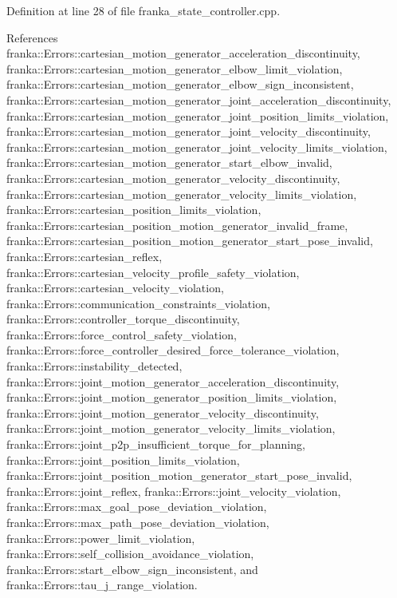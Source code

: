 Definition at line 28 of file franka\+\_\+state\+\_\+controller.\+cpp.



References franka\+::\+Errors\+::cartesian\+\_\+motion\+\_\+generator\+\_\+acceleration\+\_\+discontinuity, franka\+::\+Errors\+::cartesian\+\_\+motion\+\_\+generator\+\_\+elbow\+\_\+limit\+\_\+violation, franka\+::\+Errors\+::cartesian\+\_\+motion\+\_\+generator\+\_\+elbow\+\_\+sign\+\_\+inconsistent, franka\+::\+Errors\+::cartesian\+\_\+motion\+\_\+generator\+\_\+joint\+\_\+acceleration\+\_\+discontinuity, franka\+::\+Errors\+::cartesian\+\_\+motion\+\_\+generator\+\_\+joint\+\_\+position\+\_\+limits\+\_\+violation, franka\+::\+Errors\+::cartesian\+\_\+motion\+\_\+generator\+\_\+joint\+\_\+velocity\+\_\+discontinuity, franka\+::\+Errors\+::cartesian\+\_\+motion\+\_\+generator\+\_\+joint\+\_\+velocity\+\_\+limits\+\_\+violation, franka\+::\+Errors\+::cartesian\+\_\+motion\+\_\+generator\+\_\+start\+\_\+elbow\+\_\+invalid, franka\+::\+Errors\+::cartesian\+\_\+motion\+\_\+generator\+\_\+velocity\+\_\+discontinuity, franka\+::\+Errors\+::cartesian\+\_\+motion\+\_\+generator\+\_\+velocity\+\_\+limits\+\_\+violation, franka\+::\+Errors\+::cartesian\+\_\+position\+\_\+limits\+\_\+violation, franka\+::\+Errors\+::cartesian\+\_\+position\+\_\+motion\+\_\+generator\+\_\+invalid\+\_\+frame, franka\+::\+Errors\+::cartesian\+\_\+position\+\_\+motion\+\_\+generator\+\_\+start\+\_\+pose\+\_\+invalid, franka\+::\+Errors\+::cartesian\+\_\+reflex, franka\+::\+Errors\+::cartesian\+\_\+velocity\+\_\+profile\+\_\+safety\+\_\+violation, franka\+::\+Errors\+::cartesian\+\_\+velocity\+\_\+violation, franka\+::\+Errors\+::communication\+\_\+constraints\+\_\+violation, franka\+::\+Errors\+::controller\+\_\+torque\+\_\+discontinuity, franka\+::\+Errors\+::force\+\_\+control\+\_\+safety\+\_\+violation, franka\+::\+Errors\+::force\+\_\+controller\+\_\+desired\+\_\+force\+\_\+tolerance\+\_\+violation, franka\+::\+Errors\+::instability\+\_\+detected, franka\+::\+Errors\+::joint\+\_\+motion\+\_\+generator\+\_\+acceleration\+\_\+discontinuity, franka\+::\+Errors\+::joint\+\_\+motion\+\_\+generator\+\_\+position\+\_\+limits\+\_\+violation, franka\+::\+Errors\+::joint\+\_\+motion\+\_\+generator\+\_\+velocity\+\_\+discontinuity, franka\+::\+Errors\+::joint\+\_\+motion\+\_\+generator\+\_\+velocity\+\_\+limits\+\_\+violation, franka\+::\+Errors\+::joint\+\_\+p2p\+\_\+insufficient\+\_\+torque\+\_\+for\+\_\+planning, franka\+::\+Errors\+::joint\+\_\+position\+\_\+limits\+\_\+violation, franka\+::\+Errors\+::joint\+\_\+position\+\_\+motion\+\_\+generator\+\_\+start\+\_\+pose\+\_\+invalid, franka\+::\+Errors\+::joint\+\_\+reflex, franka\+::\+Errors\+::joint\+\_\+velocity\+\_\+violation, franka\+::\+Errors\+::max\+\_\+goal\+\_\+pose\+\_\+deviation\+\_\+violation, franka\+::\+Errors\+::max\+\_\+path\+\_\+pose\+\_\+deviation\+\_\+violation, franka\+::\+Errors\+::power\+\_\+limit\+\_\+violation, franka\+::\+Errors\+::self\+\_\+collision\+\_\+avoidance\+\_\+violation, franka\+::\+Errors\+::start\+\_\+elbow\+\_\+sign\+\_\+inconsistent, and franka\+::\+Errors\+::tau\+\_\+j\+\_\+range\+\_\+violation.



